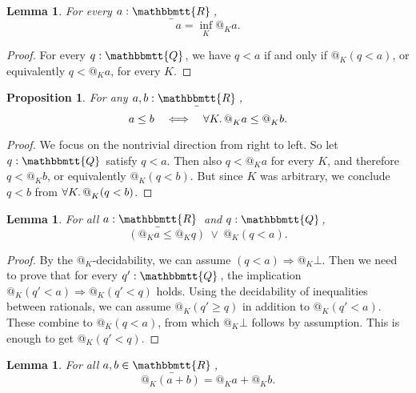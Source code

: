 \documentclass[11pt, oneside, article]{memoir}
\makeatletter
\theoremstyle{plain}
\newtheorem{proposition}[theorem]{Proposition}
\newtheorem{lemma}[theorem]{Lemma}
\theoremstyle{definition}
\theoremstyle{remark}
\newcommand{\ubar}[1]{\underaccent{\bar}{#1}}
\newcommand{\internal}[1]{\raisebox{-.03ex}{$\mathbbmtt{#1}$}}
\newcommand{\hs}{\hspace{1.1pt}}
\newcommand{\tQQ}{\internal{Q}\hs}
\newcommand{\tRR}{\internal{R}\hs}
\newcommand{\tLR}{\ubar{\tRR}\hs}
\newcommand{\AtSymbol}{{@}}
\newcommand{\At}[2][]{\AtSymbol^{#1}_{#2}}
\newcommand{\imp}{\Rightarrow}
\makeatother
\begin{document}
\begin{lemma}
	\label{lem:lower_reals_local}
	For every $a : \tLR$,
	\[
		a = \inf_K \At{K} a.
	\]
\end{lemma}

\begin{proof}
	For every $q : \tQQ$, we have $q < a$ if and only if $\At{K}(q < a)$, or equivalently $q < \At{K}a$, for every $K$.
\end{proof}

\begin{proposition}\label{prop:enough_points_LR}
For any $a,b:\tLR$,
\[
	a \leq b \quad \Longleftrightarrow \quad \forall K\ldotp \At{K} a \leq \At{K} b.
\]
\end{proposition}

\begin{proof}
	We focus on the nontrivial direction from right to left. So let $q:\tQQ$ satisfy $q < a$. Then also $q < \At{K} a$ for every $K$, and therefore $q < \At{K}b$, or equivalently $\At{K}(q < b)$. But since $K$ was arbitrary, we conclude $q < b$ from $\forall K\ldotp \At{K}(q < b)$.
\end{proof}

\begin{lemma}
	\label{lem:at_totally_ordered1}
	For all $a : \tLR$ and $q : \tQQ$,
	\[
		 (\At{K} a \leq \At{K}q) \: \lor \: \At{K}(q < a).
	\]
\end{lemma}

\begin{proof}
	By the $\At{K}$-decidability, we can assume $(q < a) \imp \At{K}\bot$. Then we need to prove that for every $q' : \tQQ$, the implication $\At{K}(q' < a) \imp \At{K}(q' < q)$ holds. Using the decidability of inequalities between rationals, we can assume $\At{K}(q' \geq q)$ in addition to $\At{K}(q' < a)$. These combine to $\At{K}(q < a)$, from which $\At{K}\bot$ follows by assumption. This is enough to get $\At{K}(q' < q)$.
\end{proof}


\begin{lemma}
	\label{lem.at_plus_commute}
	For all $a,b\in\tLR$,
	\[
		\At{K}(a + b) = \At{K} a + \At{K} b.
	\]
\end{lemma}
\end{document}
